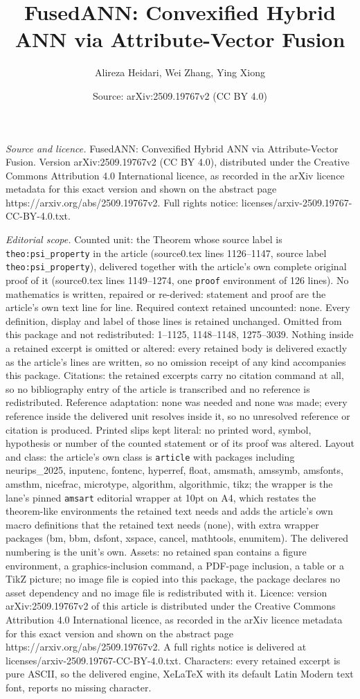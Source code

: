 \documentclass[10pt,a4paper]{amsart}
\title[FusedANN: Convexified Hybrid ANN via Attribute-Vector Fusion]{FusedANN: Convexified Hybrid ANN via Attribute-Vector Fusion}
\author{Alireza Heidari, Wei Zhang, Ying Xiong}
\date{Source: arXiv:2509.19767v2 (CC BY 4.0)}
\begin{document}
\maketitle

\noindent\emph{Source and licence.} FusedANN: Convexified Hybrid ANN via Attribute-Vector Fusion. Version arXiv:2509.19767v2 (CC BY 4.0), distributed under the Creative Commons Attribution 4.0 International licence, as recorded in the arXiv licence metadata for this exact version and shown on the abstract page https://arxiv.org/abs/2509.19767v2. Full rights notice: licenses/arxiv-2509.19767-CC-BY-4.0.txt.\par\smallskip

\noindent\textit{Editorial scope.} Counted unit: the Theorem whose source label is \texttt{theo:psi\_property} in the article (source0.tex lines 1126--1147, source label \texttt{theo:psi\_property}), delivered together with the article's own complete original proof of it (source0.tex lines 1149--1274, one \texttt{proof} environment of 126 lines). No mathematics is written, repaired or re-derived: statement and proof are the article's own text line for line. Required context retained uncounted: none. Every definition, display and label of those lines is retained unchanged. Omitted from this package and not redistributed: 1--1125, 1148--1148, 1275--3039. Nothing inside a retained excerpt is omitted or altered: every retained body is delivered exactly as the article's lines are written, so no omission receipt of any kind accompanies this package. Citations: the retained excerpts carry no citation command at all, so no bibliography entry of the article is transcribed and no reference is redistributed. Reference adaptation: none was needed and none was made; every reference inside the delivered unit resolves inside it, so no unresolved reference or citation is produced. Printed slips kept literal: no printed word, symbol, hypothesis or number of the counted statement or of its proof was altered. Layout and class: the article's own class is \texttt{article} with packages including neurips\_2025, inputenc, fontenc, hyperref, float, amsmath, amssymb, amsfonts, amsthm, nicefrac, microtype, algorithm, algorithmic, tikz; the wrapper is the lane's pinned \texttt{amsart} editorial wrapper at 10pt on A4, which restates the theorem-like environments the retained text needs and adds the article's own macro definitions that the retained text needs (none), with extra wrapper packages (bm, bbm, dsfont, xspace, cancel, mathtools, enumitem). The delivered numbering is the unit's own. Assets: no retained span contains a figure environment, a graphics-inclusion command, a PDF-page inclusion, a table or a TikZ picture; no image file is copied into this package, the package declares no asset dependency and no image file is redistributed with it. Licence: version arXiv:2509.19767v2 of this article is distributed under the Creative Commons Attribution 4.0 International licence, as recorded in the arXiv licence metadata for this exact version and shown on the abstract page https://arxiv.org/abs/2509.19767v2. A full rights notice is delivered at licenses/arxiv-2509.19767-CC-BY-4.0.txt. Characters: every retained excerpt is pure ASCII, so the delivered engine, XeLaTeX with its default Latin Modern text font, reports no missing character.
\end{document}
